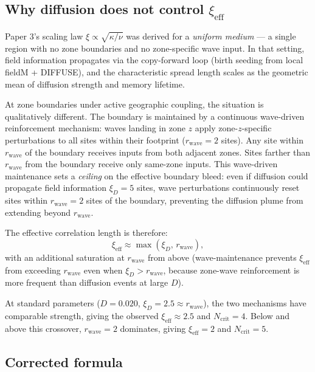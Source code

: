 \documentclass[11pt]{article}
\begin{document}
\subsection*{Why diffusion does not control $\xi_{\mathrm{eff}}$}

Paper 3's scaling law $\xi \propto \sqrt{\kappa/\nu}$ was derived for a
\emph{uniform medium} --- a single region with no zone boundaries and no
zone-specific wave input. In that setting, field information propagates
via the copy-forward loop (birth seeding from local fieldM + DIFFUSE), and the
characteristic spread length scales as the geometric mean of diffusion
strength and memory lifetime.

At zone boundaries under active geographic coupling, the situation is
qualitatively different. The boundary is maintained by a continuous
wave-driven reinforcement mechanism: waves landing in zone $z$ apply
zone-$z$-specific perturbations to all sites within their footprint
($r_{\mathrm{wave}} = 2$ sites). Any site within $r_{\mathrm{wave}}$ of the
boundary receives inputs from both adjacent zones. Sites farther than
$r_{\mathrm{wave}}$ from the boundary receive only same-zone inputs.
This wave-driven maintenance sets a \emph{ceiling} on the effective
boundary bleed: even if diffusion could propagate field information
$\xi_D = 5$ sites, wave perturbations continuously reset sites within
$r_{\mathrm{wave}} = 2$ sites of the boundary, preventing the diffusion
plume from extending beyond $r_{\mathrm{wave}}$.

The effective correlation length is therefore:
\begin{equation}
  \xi_{\mathrm{eff}} \approx \max(\xi_D,\, r_{\mathrm{wave}}),
  \label{eq:xi_eff}
\end{equation}
with an additional saturation at $r_{\mathrm{wave}}$ from above (wave-maintenance
prevents $\xi_{\mathrm{eff}}$ from exceeding $r_{\mathrm{wave}}$ even when
$\xi_D > r_{\mathrm{wave}}$, because zone-wave reinforcement is more
frequent than diffusion events at large $D$).

At standard parameters ($D = 0.020$, $\xi_D = 2.5 \approx r_{\mathrm{wave}}$),
the two mechanisms have comparable strength, giving the observed
$\xi_{\mathrm{eff}} \approx 2.5$ and $N_{\mathrm{crit}} = 4$.
Below and above this crossover, $r_{\mathrm{wave}} = 2$ dominates, giving
$\xi_{\mathrm{eff}} = 2$ and $N_{\mathrm{crit}} = 5$.

\subsection*{Corrected formula}
\end{document}
